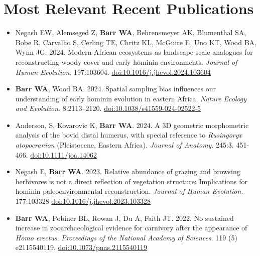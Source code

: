 \documentclass{article}
\begin{document}
\section*{Most Relevant Recent Publications}

\begin{itemize} 





\item[] Negash EW,  Alemseged Z,  {\bfseries Barr WA}, Behrensmeyer AK, Blumenthal SA, Bobe R, Carvalho S, Cerling TE, Chritz KL, McGuire E, Uno KT,  Wood BA, Wynn JG. 2024. Modern African ecosystems as landscape-scale analogues for reconstructing woody cover and early hominin environments. \emph{Journal of Human Evolution}. 197:103604. \href{https://doi.org/10.1016/j.jhevol.2024.103604}{doi:10.1016/j.jhevol.2024.103604}

\item[]  {\bfseries Barr WA}, Wood BA. 2024. Spatial sampling bias influences our understanding of early hominin evolution in eastern Africa. \emph{Nature Ecology and Evolution}. 8:2113–2120. \href{https://www.nature.com/articles/s41559-024-02522-5}{doi:10.1038/s41559-024-02522-5}

\item[] Anderson, S, Kovarovic K,  {\bfseries Barr WA}. 2024. A 3D geometric morphometric analysis of the bovid distal humerus, with special reference to \emph{Rusingoryx atopocranion} (Pleistocene, Eastern Africa). \emph{Journal of Anatomy}. 245:3. 451-466. \href{https://doi.org/10.1111/joa.14062}{doi:10.1111/joa.14062}


\item[] Negash E, {\bfseries Barr WA}. 2023. Relative abundance of grazing and browsing herbivores is not a direct reflection of vegetation structure: Implications for hominin paleoenvironmental reconstruction. \emph{Journal of Human Evolution}. 177:103328 \href{https://doi.org/10.1016/j.jhevol.2023.103328}{doi:10.1016/j.jhevol.2023.103328}


\item[]  {\bfseries Barr WA}, Pobiner BL, Rowan J, Du A, Faith JT.  2022. No sustained increase in zooarchaeological evidence for carnivory after the appearance of \emph{Homo erectus}. \emph{Proceedings of the National Academy of Sciences}. 119 (5) e2115540119. \href{https://doi.org/10.1073/pnas.2115540119}{doi:10.1073/pnas.2115540119}


\end{itemize}
\end{document}
